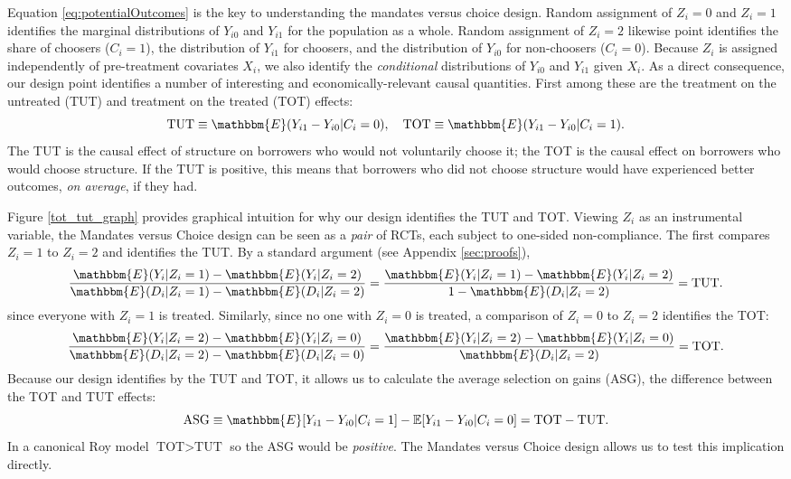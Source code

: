 \documentclass[12pt, a4paper, colorinlistoftodos]{article}
\begin{document}
Equation \ref{eq:potentialOutcomes} is the key to understanding the mandates versus choice design. 
Random assignment of $Z_i=0$ and $Z_i = 1$ identifies the marginal distributions of $Y_{i0}$ and $Y_{i1}$ for the population as a whole. 
Random assignment of $Z_i=2$ likewise point identifies the share of choosers ($C_i = 1$), the distribution of $Y_{i1}$ for choosers, and the distribution of $Y_{i0}$ for non-choosers ($C_i = 0$).
Because $Z_i$ is assigned independently of pre-treatment covariates $X_i$, we also identify the \emph{conditional} distributions of $Y_{i0}$ and $Y_{i1}$ given $X_i$. 
As a direct consequence, our design point identifies a number of interesting and economically-relevant causal quantities. 
First among these are the treatment on the untreated (TUT) and treatment on the treated (TOT) effects:  
\[
\text{TUT} \equiv \mathbbm{E}(Y_{i1} - Y_{i0} | C_i = 0), \quad
\text{TOT} \equiv \mathbbm{E}(Y_{i1} - Y_{i0} | C_i = 1).
\]
The TUT is the causal effect of structure on borrowers who would not voluntarily choose it; the TOT is the causal effect on borrowers who would choose structure.
If the TUT is positive, this means that borrowers who did not choose structure would have experienced better outcomes, \emph{on average}, if they had. 

Figure \ref{tot_tut_graph} provides graphical intuition for why our design identifies the TUT and TOT. 
Viewing $Z_i$ as an instrumental variable, the Mandates versus Choice design can be seen as a \emph{pair} of RCTs, each subject to one-sided non-compliance.
The first compares $Z_i = 1$ to $Z_i=2$ and identifies the TUT.
By a standard argument (see Appendix \ref{sec:proofs}), 
\begin{equation}
\frac{\mathbbm{E}(Y_i|Z_i=1) - \mathbbm{E}(Y_i|Z_i =2)}{\mathbbm{E}(D_i|Z_i=1)-\mathbbm{E}(D_i|Z_i=2)} = 
\frac{\mathbbm{E}(Y_i|Z_i=1) - \mathbbm{E}(Y_i|Z_i =2)}{1 - \mathbbm{E}(D_i|Z_i=2)} = \text{TUT}.
\label{eq:TUT}
\end{equation}
since everyone with $Z_i=1$ is treated.
Similarly, since no one with $Z_i = 0$ is treated, a comparison of $Z_i=0$ to $Z_i = 2$ identifies the TOT:
\begin{equation}
\frac{\mathbbm{E}(Y_i|Z_i=2) - \mathbbm{E}(Y_i|Z_i =0)}{\mathbbm{E}(D_i|Z_i=2)-\mathbbm{E}(D_i|Z_i=0)} = 
\frac{\mathbbm{E}(Y_i|Z_i=2) - \mathbbm{E}(Y_i|Z_i =0)}{\mathbbm{E}(D_i|Z_i=2)} = \text{TOT}.
\label{eq:TOT}
\end{equation}
Because our design identifies by the TUT and TOT, it allows us to calculate the average selection on gains (ASG), the difference between the TOT and TUT effects:
\[
\text{ASG} \equiv \mathbbm{E}[Y_{i1} - Y_{i0}|C_i = 1] - \mathbb{E}[Y_{i1} - Y_{i0} | C_i = 0] = \text{TOT} - \text{TUT}.
\]
In a canonical Roy model $\text{TOT} > \text{TUT}$ so the ASG would be \emph{positive}.
The Mandates versus Choice design allows us to test this implication directly.
\end{document}

